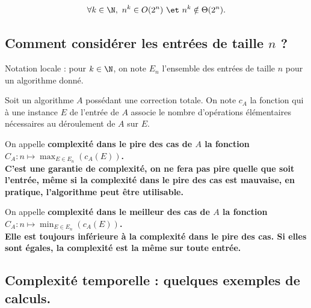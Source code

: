 \documentclass[french, 11pt]{article}
\begin{document}
\vspace*{-0.3cm}

\begin{corr}{}{}
    \begin{equation*}
        \forall k \in \N, ~ n^k \in O(2^n) ~ \et ~ n^k \notin \Theta(2^n).
    \end{equation*}
\end{corr}

\subsection{Comment considérer les entrées de taille \texorpdfstring{$n$}{Lg} ?}

Notation locale : pour $k\in\N$, on note $E_n$ l'ensemble des entrées de taille $n$ pour un algorithme donné.

\begin{defi}{}{}
    Soit un algorithme $A$ possédant une correction totale. On note $c_A$ la fonction qui à une instance $E$ de l'entrée de $A$ associe le nombre d'opérations élémentaires nécessaires au déroulement de $A$ sur $E$.
\end{defi}

\vspace*{-0.3cm}

\begin{defi}{}{}
    On appelle \bf{complexité dans le pire des cas} de $A$ la fonction $C_A:n\mapsto \max_{E\in E_n}(c_A(E))$.\\
    C'est une garantie de complexité, on ne fera pas pire quelle que soit l'entrée, même si la complexité dans le pire des cas est mauvaise, en pratique, l'algorithme peut être utilisable.
\end{defi}

\vspace*{-0.3cm}

\begin{defi}{}{}
    On appelle \bf{complexité dans le meilleur des cas} de $A$ la fonction $C_A:n\mapsto \min_{E\in E_n}(c_A(E))$.\\
    Elle est toujours inférieure à la complexité dans le pire des cas. Si elles sont égales, la complexité est la même sur toute entrée.
\end{defi}

\subsection{Complexité temporelle : quelques exemples de calculs.}
\end{document}
